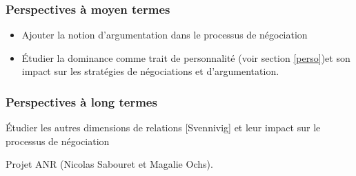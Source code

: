 \documentclass [french]{article}
\begin{document}
			\subsubsection{Perspectives à moyen termes}
			\begin{itemize}
				\item	Ajouter la notion d'argumentation dans le processus de négociation
				\item	Étudier la dominance comme trait de personnalité (voir section \ref{perso})et son impact sur les stratégies de négociations et d'argumentation.

			\end{itemize}

			\subsubsection{Perspectives à long termes}
				Étudier les autres dimensions de relations [Svennivig] et leur impact sur le processus de négociation
				
				Projet ANR (Nicolas Sabouret et Magalie Ochs).
\end{document}
